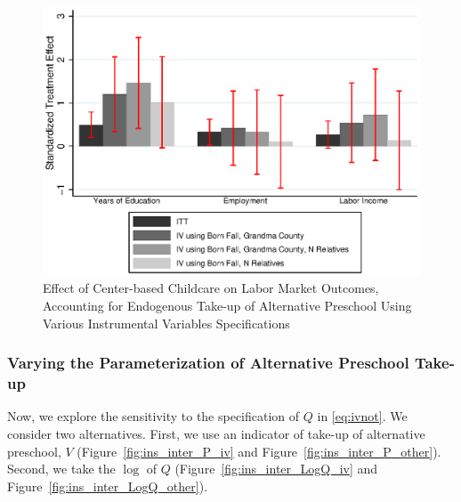 \begin{figure}[H]
		\caption{Effect of Center-based Childcare on Labor Market Outcomes, Accounting for Endogenous Take-up of Alternative Preschool Using Various Instrumental Variables Specifications} \label{fig:inter_Q_other}
		\includegraphics[width=.8\columnwidth]{output/appendixplots/inter_Q_iv_other.eps}
\end{figure}

\subsubsection{Varying the Parameterization of Alternative Preschool Take-up}

\noindent Now, we explore the sensitivity to the specification of $Q$ in \eqref{eq:ivnot}. We consider two alternatives. First, we use an indicator of take-up of alternative preschool, $V$ (Figure~\ref{fig:ins_inter_P_iv} and Figure~\ref{fig:ins_inter_P_other}). Second, we take the $\log$ of $Q$ (Figure~\ref{fig:ins_inter_LogQ_iv} and Figure~\ref{fig:ins_inter_LogQ_other}).

